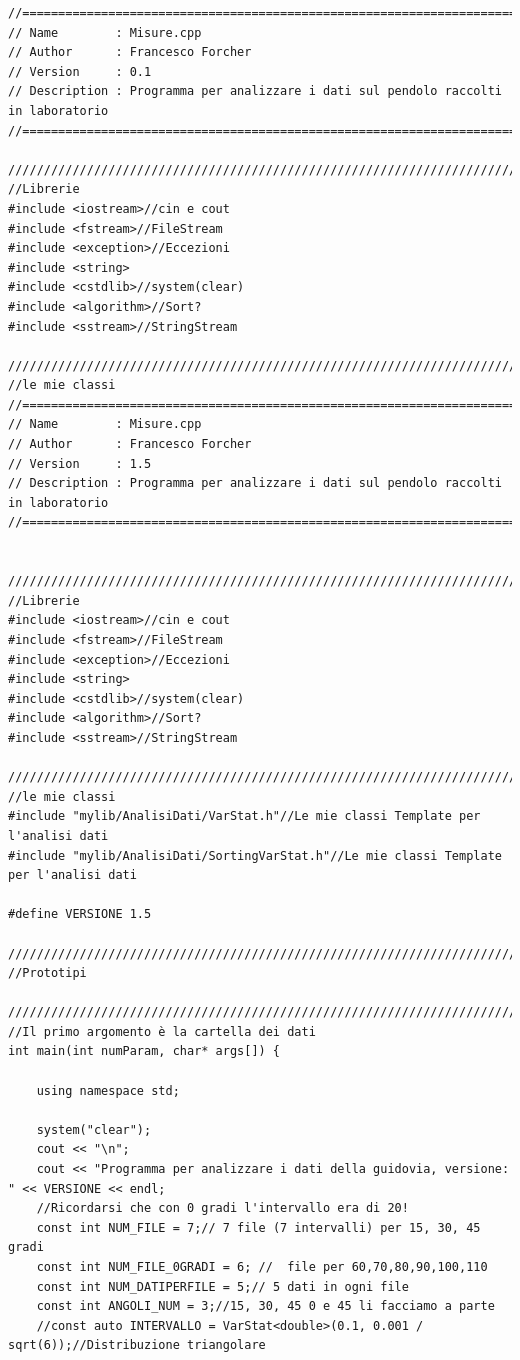 \documentclass[12pt]{article} %
\begin{document}
	\begin{verbatim}
//============================================================================
// Name        : Misure.cpp
// Author      : Francesco Forcher
// Version     : 0.1
// Description : Programma per analizzare i dati sul pendolo raccolti in laboratorio
//============================================================================

/////////////////////////////////////////////////////////////////////////////////////
//Librerie
#include <iostream>//cin e cout
#include <fstream>//FileStream
#include <exception>//Eccezioni
#include <string>
#include <cstdlib>//system(clear)
#include <algorithm>//Sort?
#include <sstream>//StringStream

/////////////////////////////////////////////////////////////////////////////////////
//le mie classi
//============================================================================
// Name        : Misure.cpp
// Author      : Francesco Forcher
// Version     : 1.5
// Description : Programma per analizzare i dati sul pendolo raccolti in laboratorio
//============================================================================


/////////////////////////////////////////////////////////////////////////////////////
//Librerie
#include <iostream>//cin e cout
#include <fstream>//FileStream
#include <exception>//Eccezioni
#include <string>
#include <cstdlib>//system(clear)
#include <algorithm>//Sort?
#include <sstream>//StringStream

/////////////////////////////////////////////////////////////////////////////////////
//le mie classi
#include "mylib/AnalisiDati/VarStat.h"//Le mie classi Template per l'analisi dati
#include "mylib/AnalisiDati/SortingVarStat.h"//Le mie classi Template per l'analisi dati

#define VERSIONE 1.5

/////////////////////////////////////////////////////////////////////////////////////
//Prototipi

/////////////////////////////////////////////////////////////////////////////////////
//Il primo argomento è la cartella dei dati
int main(int numParam, char* args[]) {

	using namespace std;

	system("clear");
	cout << "\n";
	cout << "Programma per analizzare i dati della guidovia, versione: " << VERSIONE << endl;
	//Ricordarsi che con 0 gradi l'intervallo era di 20!
	const int NUM_FILE = 7;// 7 file (7 intervalli) per 15, 30, 45 gradi
	const int NUM_FILE_0GRADI = 6; //  file per 60,70,80,90,100,110
	const int NUM_DATIPERFILE = 5;// 5 dati in ogni file
	const int ANGOLI_NUM = 3;//15, 30, 45 0 e 45 li facciamo a parte
	//const auto INTERVALLO = VarStat<double>(0.1, 0.001 / sqrt(6));//Distribuzione triangolare


\end{verbatim}
\end{document}
